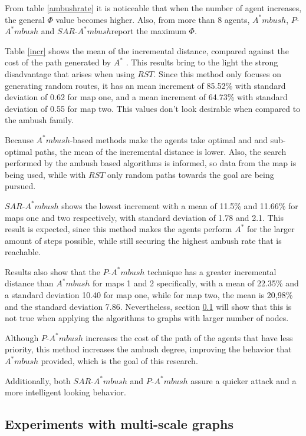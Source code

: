 From table \ref{ambushrate} it is noticeable that
when the number of agent increases, the general
$\Phi$ value becomes higher. Also, from more than 8 	
agents, $A^*mbush$, $P$-$A^*mbush$ and 
$SAR$-$A^*mbush$report the maximum $\Phi$.



Table \ref{incr} shows the mean of the incremental distance, 
compared against the cost of the path generated by $A^*$ .
This results bring to the light the strong disadvantage
that arises when using $RST$. Since this method only
focuses on generating random routes, it has an mean 
increment of 85.52\% with standard deviation of 0.62 for 
map one, and a mean increment of 64.73\% with standard
deviation of 0.55 for map two. This values don't look
desirable when compared to the ambush family.

Because $A^*mbush$-based methods make the agents take
optimal and and sub-optimal paths, the mean of the incremental
distance is lower. Also, the search performed 
by the ambush based algorithms is informed, so data from the map is 
being used, while with $RST$ only random paths
towards the goal are being pursued. 

$SAR$-$A^*mbush$ shows the lowest increment with a mean of 
11.5\% and 11.66\% for maps one and two respectively,
with standard deviation of 1.78 and 2.1. This result is
expected, since this method makes the agents perform 
$A^*$ for the larger amount of steps possible, while still securing 
 the highest ambush rate that is reachable.  

Results also show that the $P$-$A^*mbush$ technique has
a greater incremental distance than $A^*mbush$ for
maps 1 and 2 specifically, with a mean of 22.35\% and a standard 
deviation 10.40 for map one, while for map two, the mean is 20,98\%
and the standard deviation 7.86.  Nevertheless, section
\ref{sec:Multigraph} will show that this is not true when 
applying the algorithms to graphs with larger number of nodes.
 
Although $P$-$A^*mbush$ increases the cost of the path
of the agents that have less priority, this method increases
the ambush degree, improving the behavior that $A^*mbush$
provided, which is the goal of this research. 

Additionally, both $SAR$-$A^*mbush$ and $P$-$A^*mbush$
 assure a quicker attack and a more intelligent looking behavior.

\subsection{Experiments with multi-scale graphs}
\label{sec:Multigraph}

